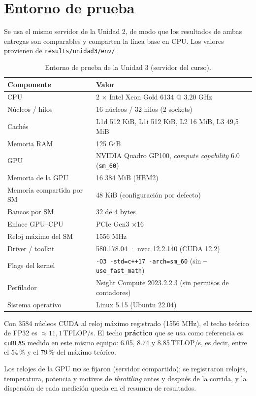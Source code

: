 \section{Entorno de prueba}

	Se usa el mismo servidor de la Unidad 2, de modo que los resultados de ambas entregas son comparables y comparten la línea base en CPU. Los valores provienen de \texttt{results/unidad3/env/}.

	\begin{table}[H]
		\centering
		\caption{Entorno de prueba de la Unidad 3 (servidor del curso).}
		\small
		\begin{tabular}{lp{10.2cm}}
			\hline
			\textbf{Componente} & \textbf{Valor} \bigstrut\\
			\hline
			CPU & 2 $\times$ Intel Xeon Gold 6134 @ 3.20 GHz \\
			Núcleos / hilos & 16 núcleos / 32 hilos (2 sockets) \\
			Cachés & L1d 512 KiB, L1i 512 KiB, L2 16 MiB, L3 49,5 MiB \\
			Memoria RAM & 125 GiB \\
			GPU & NVIDIA Quadro GP100, \textit{compute capability} 6.0 (\texttt{sm\_60}) \\
			Memoria de la GPU & 16 384 MiB (HBM2) \\
			Memoria compartida por SM & 48 KiB (configuración por defecto) \\
			Bancos por SM & 32 de 4 bytes \\
			Enlace GPU--CPU & PCIe Gen3 $\times$16 \\
			Reloj máximo del SM & 1556 MHz \\
			Driver / toolkit & 580.178.04 · nvcc 12.2.140 (CUDA 12.2) \\
			Flags del kernel & \texttt{-O3 -std=c++17 -arch=sm\_60} (sin \texttt{--use\_fast\_math}) \\
			Perfilador & Nsight Compute 2023.2.2.3 (sin permisos de contadores) \\
			Sistema operativo & Linux 5.15 (Ubuntu 22.04) \bigstrut[b]\\
			\hline
		\end{tabular}
		\label{tab:entorno-u3}
	\end{table}

	Con 3584 núcleos CUDA al reloj máximo registrado (1556 MHz), el techo teórico de FP32 es $\approx 11{,}1$\,TFLOP/s. El techo \textbf{práctico} que se usa como referencia es \texttt{cuBLAS} medido en este mismo equipo: 6.05, 8.74 y 8.85\,TFLOP/s, es decir, entre el 54\,\% y el 79\,\% del máximo teórico.

	Los relojes de la GPU \textbf{no} se fijaron (servidor compartido); se registraron relojes, temperatura, potencia y motivos de \textit{throttling} antes y después de la corrida, y la dispersión de cada medición queda en el resumen de resultados.

